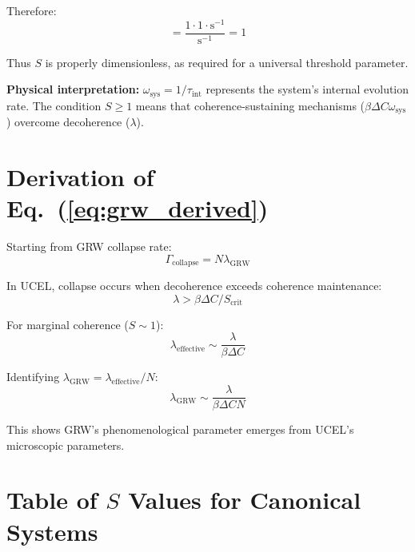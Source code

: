\documentclass[12pt,a4paper]{article}
\begin{document}
Therefore:
\begin{equation}
[S] = \frac{1 \cdot 1 \cdot \text{s}^{-1}}{\text{s}^{-1}} = 1
\end{equation}

Thus $S$ is properly dimensionless, as required for a universal threshold parameter.

\textbf{Physical interpretation:} $\omega_{\text{sys}} = 1/\tau_{\text{int}}$ represents the system's internal evolution rate. The condition $S \geq 1$ means that coherence-sustaining mechanisms ($\beta \Delta C \omega_{\text{sys}}$) overcome decoherence ($\lambda$).

\section{Derivation of Eq.~(\ref{eq:grw_derived})}
\label{app:grw_derivation}

Starting from GRW collapse rate:
\begin{equation}
\Gamma_{\text{collapse}} = N \lambda_{\text{GRW}}
\end{equation}

In UCEL, collapse occurs when decoherence exceeds coherence maintenance:
\begin{equation}
\lambda > \beta \Delta C / S_{\text{crit}}
\end{equation}

For marginal coherence ($S \sim 1$):
\begin{equation}
\lambda_{\text{effective}} \sim \frac{\lambda}{\beta \Delta C}
\end{equation}

Identifying $\lambda_{\text{GRW}} = \lambda_{\text{effective}} / N$:
\begin{equation}
\lambda_{\text{GRW}} \sim \frac{\lambda}{\beta \Delta C N}
\end{equation}

This shows GRW's phenomenological parameter emerges from UCEL's microscopic parameters.

\section{Table of $S$ Values for Canonical Systems}
\label{app:table}
\end{document}
